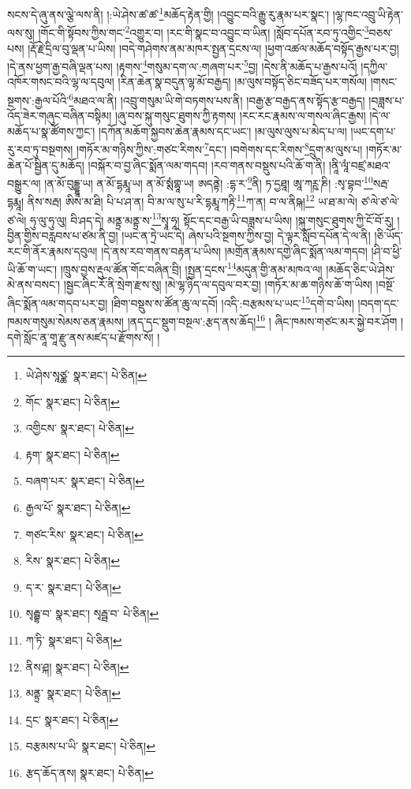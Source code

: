 སངས་དེ་ཞུ་ནས་ལྕེ་ལས་ནི། །:ཡེ་ཤེས་ཚ་ཚ་\footnote{ཡེ་ཤེས་སཱཙྪ་  སྣར་ཐང་།  པེ་ཅིན། }མཆོད་རྟེན་གྱི། །འབྱུང་བའི་རྒྱུ་རུ་རྣམ་པར་སྣང་། །ལྷ་ཁང་འབྲུ་ཡི་རྟེན་ལས་སུ། །གོང་གི་སྟོབས་ཀྱིས་གང་\footnote{གོང་  སྣར་ཐང་།  པེ་ཅིན། }འགྱུར་བ། །རང་གི་སྣང་བ་འབྱུང་བ་ཡིན། །སློབ་དཔོན་རབ་ཏུ་འགྱིང་\footnote{འགྱིངས་  སྣར་ཐང་།  པེ་ཅིན། }བཅས་པས། །རྡོ་རྗེ་དྲིལ་བུ་ལྡན་པ་ཡིས། །བདེ་གཤེགས་ནམ་མཁར་སྤྱན་དྲངས་ལ། །ཕྱག་འཚལ་མཆོད་བསྟོད་རྒྱས་པར་བྱ། །དེ་ནས་ཕྱག་རྒྱ་བཞི་ལྡན་པས། །རྟགས་\footnote{རྟག་  སྣར་ཐང་།  པེ་ཅིན། }གསུམ་དག་ལ་:གཞག་པར་\footnote{བཞག་པར་  སྣར་ཐང་།  པེ་ཅིན། }བྱ། །དེས་ནི་མཆོད་པ་རྒྱས་པའོ། །དཀྱིལ་འཁོར་གསང་བའི་ལྷ་ལ་དབུལ། །རིན་ཆེན་སྣ་བདུན་ལྷ་མོ་བརྒྱད། །མ་ལུས་བསྟོད་ཅིང་བཟོད་པར་གསོལ། །གསང་སྔགས་:རྒྱལ་པོའི་\footnote{རྒྱལ་པོ་  སྣར་ཐང་།  པེ་ཅིན། }མཐའ་ལ་ནི། །འབྲུ་གསུམ་ཡི་གེ་བཏགས་པས་ནི། །བརྒྱ་རྩ་བརྒྱད་ནས་སྟོད་རྩ་བརྒྱད། །བཟླས་པ་འོད་ཟེར་གཞུང་བཞིན་བསྟིམ། །ཞུ་བས་སྐུ་གསུང་ཐུགས་ཀྱི་རྟགས། །རང་རང་རྣམས་ལ་གསལ་ཞིང་རྒྱས། །དེ་ལ་མཆོད་པ་སྣ་ཚོགས་ཀྱང་། །དཀོན་མཆོག་སྐྱབས་ཆེན་རྣམས་དང་ཡང་། །མ་ལུས་ལུས་པ་མེད་པ་ལ། །ཡང་དག་པ་རུ་རབ་ཏུ་བསྔགས། །གཏོར་མ་གཉིས་ཀྱིས་:གཙང་རིགས་\footnote{གཙང་རིས་  སྣར་ཐང་།  པེ་ཅིན། }དང་། །བགེགས་དང་རིགས་\footnote{རིས་  སྣར་ཐང་།  པེ་ཅིན། }དྲུག་མ་ལུས་པ། །གཏོར་མ་ཆེན་པོ་སྦྱིན་དུ་མཆོད། །བསྐོར་བ་བྱ་ཞིང་སྨོན་ལམ་གདབ། །རབ་གནས་བསྡུས་པའི་ཆོ་ག་ནི། །ནཱི་ལཱཾ་བཛྲ་མཐའ་བསྒྱུར་ལ། །ན་མོ་བུདྡྷཱ་ཡ། ན་མོ་དྷརྨཱ་ཡ། ན་མོ་སྶཾགྷཱ་ཡ། ཨདནྟེ། :དྷ་ར་\footnote{ད་ར་  སྣར་ཐང་།  པེ་ཅིན། }ནི། ཏ་དྱཐཱ། ཨཱ་ཀཪྵ་ཎི། :སྭ་བྷབ་\footnote{སྭརྦྷ་བ་  སྣར་ཐང་། སྭརྦྦ་བ་  པེ་ཅིན། }སརྦ་དྷརྨཱ། ནིས་སརྦ། ཨིས་མ་ཐི། པི་པ་ཤ་ན། བི་མ་ལ་སུ་པ་རི་དྷརྨཱ་ཀརྟི་\footnote{ཀ་ཏི་  སྣར་ཐང་།  པེ་ཅིན། }ཀ་ན། བ་ལ་ནིཥྐ།\footnote{ནིས་ཤྐ།  སྣར་ཐང་།  པེ་ཅིན། } ཡ་ཐ་མ་ལེ། ཙ་ལེ་ཙ་ལེ་ཙ་ལེ། ཧུ་ལུ་ཧུ་ལུ། བི་ཤད་དེ། མནྟྲ་མནྟྲ་ས་\footnote{མནྟྲ་  སྣར་ཐང་།  པེ་ཅིན། }སྭཱ་ཧཱ། སྟོང་དང་བརྒྱ་ཡི་བཟླས་པ་ཡིས། །སྐུ་གསུང་ཐུགས་ཀྱི་ངོ་བོ་རུ། །བྱིན་གྱིས་བརླབས་པ་ཙམ་ནི་བྱ། །ཡང་ན་ཏྲེ་ཡང་དེ། ཞེས་པའི་སྔགས་ཀྱིས་བྱ། དེ་ལྟར་སློབ་དཔོན་དེ་ལ་ནི། །ཅི་ཡོད་རང་གི་ནོར་རྣམས་དབུལ། །དེ་ནས་རབ་གནས་བརྟན་པ་ཡིས། །མགྲོན་རྣམས་དགྱེ་ཞིང་སྨོན་ལམ་གདབ། །ཤི་བ་ཕྱི་ཡི་ཆོ་ག་ཡང་། །ཁྲུས་བྱས་རྡུལ་ཚོན་གོང་བཞིན་བྲི། །སྤྱན་དྲངས་\footnote{དྲང་  སྣར་ཐང་།  པེ་ཅིན། }མདུན་གྱི་ནམ་མཁའ་ལ། །མཆོད་ཅིང་ཡེ་ཤེས་མེ་ནས་བསང་། །སྦྱང་ཞིང་རོ་ནི་སྲེག་རྫས་སུ། །མེ་ལྷ་ཉིད་ལ་དབུལ་བར་བྱ། །གཏོར་མ་ཆ་གཉིས་ཆོ་ག་ཡིས། །བསྔོ་ཞིང་སྨོན་ལམ་གདབ་པར་བྱ། །ཐིག་བསྡུས་ས་ཚོན་ཆུ་ལ་དབོ། །འདི་:བརྩམས་པ་ཡང་\footnote{བརྩམས་པ་ཡི་  སྣར་ཐང་།  པེ་ཅིན། }དགེ་བ་ཡིས། །བདག་དང་ཁམས་གསུམ་སེམས་ཅན་རྣམས། །ནད་དང་སྡུག་བསྔལ་:རྩད་ནས་ཆོད།\footnote{རྩད་ཆོད་ནས།  སྣར་ཐང་།  པེ་ཅིན། } །
ཞིང་ཁམས་གཙང་མར་སྐྱེ་བར་ཤོག །དགེ་སློང་ནཱ་གཱ་རྫུ་ནས་མཛད་པ་རྫོགས་སོ། ། 